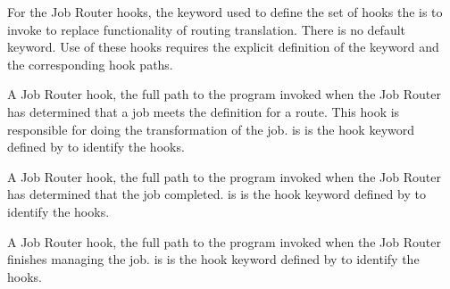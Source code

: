 \begin{description}
\label{param:JobRouterHookKeyword}
\item[\Macro{JOB\_ROUTER\_HOOK\_KEYWORD}]
  For the Job Router hooks,
  the keyword used to define the set of hooks the 
  is to invoke to replace functionality of routing translation.
  There is no default keyword.
  Use of these hooks requires the explicit definition of the
  keyword and the corresponding hook paths.

\label{param:HookTranslateJob}
\item[\Macro{<Keyword>\_HOOK\_TRANSLATE\_JOB}]
  A Job Router hook,
  the full path to the program invoked when the Job Router has determined
  that a job meets the definition for a route.  
  This hook is responsible for doing the transformation of the job.
   is is the hook keyword defined by
   to identify the hooks.

\label{param:HookJobFinalize}
\item[\Macro{<Keyword>\_HOOK\_JOB\_FINALIZE}]
  A Job Router hook,
  the full path to the program invoked when the Job Router has determined
  that the job completed.
   is is the hook keyword defined by
   to identify the hooks.

\label{param:HookJobCleanup}
\item[\Macro{<Keyword>\_HOOK\_JOB\_CLEANUP}]
  A Job Router hook,
  the full path to the program invoked when the Job Router finishes 
  managing the job.
   is is the hook keyword defined by
   to identify the hooks.

\end{description}
